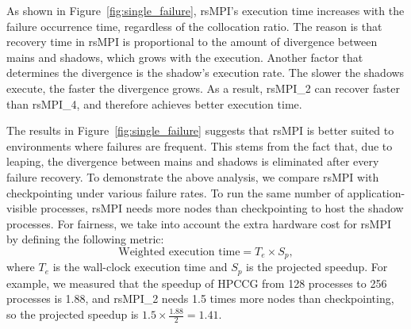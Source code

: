 As shown in Figure~\ref{fig:single_failure}, rsMPI's execution time increases with the failure occurrence time, regardless of the collocation ratio. The reason is that recovery time in rsMPI is proportional to the amount of divergence between mains and shadows, which grows with the execution. 
Another factor that determines the divergence is the shadow's execution rate. The slower the shadows execute, the faster the divergence grows. As a result, rsMPI\_2 can recover faster than rsMPI\_4, and therefore achieves better execution time.


The results in Figure~\ref{fig:single_failure} suggests that rsMPI is better suited to environments where failures are frequent. 
This stems from the fact that, due to leaping, the divergence between mains and shadows is eliminated after every failure recovery. %
To demonstrate the above analysis, we compare rsMPI with checkpointing under various failure rates. 
To run the same number of application-visible processes, rsMPI needs more nodes than checkpointing to host the shadow processes. 
For fairness, we take into account the extra hardware cost for rsMPI by defining the following metric:
$$\text{Weighted execution time} = T_e \times S_p,$$ where $T_e$ is the wall-clock execution time and $S_p$ is the projected speedup. For example, we measured that the speedup of HPCCG from 128 processes to 256 processes is 1.88, and rsMPI\_2 needs 1.5 times more nodes than checkpointing, so the projected speedup is $1.5\times\frac{1.88}{2}=1.41$. %


